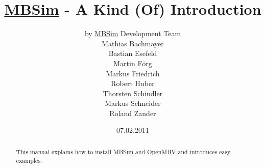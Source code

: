 \documentclass[fleqn,11pt]{article}
\newcommand{\MBSim}{\href{http://mbsim.berlios.de}{\textsf{MBSim}}}
\newcommand{\OpenMBV}{\href{http://*.berlios.de}{\textsf{OpenMBV}}}
\begin{document}
\title{\MBSim{} - A Kind (Of) Introduction}
\author{by \MBSim{} Development Team\\
  Mathias Bachmayer\\
  Bastian Esefeld\\
  Martin F\"org\\
  Markus Friedrich\\
  Robert Huber\\
  Thorsten Schindler\\
  Markus Schneider\\
  Roland Zander}
\date{07.02.2011}
\maketitle

\begin{abstract}
  This manual explains how to install \MBSim{} and \OpenMBV{} and introduces easy examples.
\end{abstract}

\noindent\hrulefill
\tableofcontents






\appendix





\end{document}
